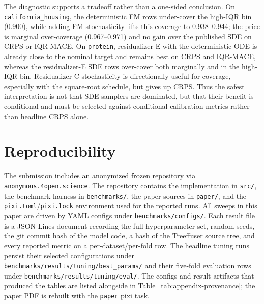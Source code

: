 \documentclass{tpm2026}
\begin{document}
The diagnostic supports a tradeoff rather than a one-sided conclusion. On \texttt{california\_housing}, the deterministic FM rows under-cover the high-IQR bin (0.900), while adding FM stochasticity lifts this coverage to 0.938--0.944; the price is marginal over-coverage (0.967--0.971) and no gain over the published SDE on CRPS or IQR-MACE. On \texttt{protein}, residualizer-E with the deterministic ODE is already close to the nominal target and remains best on CRPS and IQR-MACE, whereas the residualizer-E SDE rows over-cover both marginally and in the high-IQR bin. Residualizer-C stochasticity is directionally useful for coverage, especially with the square-root schedule, but gives up CRPS. Thus the safest interpretation is not that SDE samplers are dominated, but that their benefit is conditional and must be selected against conditional-calibration metrics rather than headline CRPS alone.

\section{Reproducibility}\label{app:repro}

The submission includes an anonymized frozen repository via \texttt{anonymous.4open.science}. The repository contains the implementation in \texttt{src/}, the benchmark harness in \texttt{benchmarks/}, the paper sources in \texttt{paper/}, and the \texttt{pixi.toml}/\texttt{pixi.lock} environment used for the reported runs. All sweeps in this paper are driven by YAML configs under \texttt{benchmarks/configs/}. Each result file is a JSON Lines document recording the full hyperparameter set, random seeds, the git commit hash of the model code, a hash of the Treeffuser source tree, and every reported metric on a per-dataset/per-fold row. The headline tuning runs persist their selected configurations under \texttt{benchmarks/results/tuning/best\_params/} and their five-fold evaluation rows under \texttt{benchmarks/results/tuning/eval/}. The configs and result artifacts that produced the tables are listed alongside in Table~\ref{tab:appendix-provenance}; the paper PDF is rebuilt with the \texttt{paper} pixi task.
\end{document}
